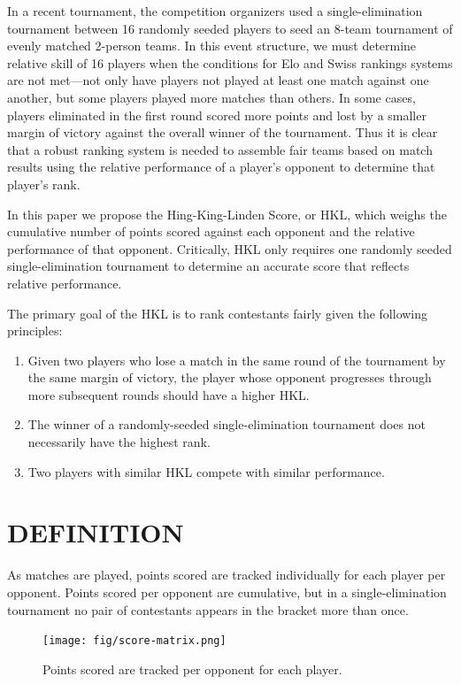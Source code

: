 \documentclass[letterpaper, 10 pt, conference]{ieeeconf}  %
\begin{document}
In a recent tournament, the competition organizers used a single-elimination
tournament between 16 randomly seeded players to seed an 8-team tournament of
evenly matched 2-person teams. In this event structure, we must determine
relative skill of 16 players when the conditions for Elo and Swiss rankings
systems are not met---not only have players not played at least one match
against one another, but some players played more matches than others. In some
cases, players eliminated in the first round scored more points and lost by a
smaller margin of victory against the overall winner of the tournament. Thus it
is clear that a robust ranking system is needed to assemble fair teams based on
match results using the relative performance of a player's opponent to determine
that player's rank.

In this paper we propose the Hing-King-Linden Score, or HKL, which weighs the
cumulative number of points scored against each opponent and the relative
performance of that opponent. Critically, HKL only requires one randomly seeded
single-elimination tournament to determine an accurate score that reflects
relative performance. 

The primary goal of the HKL is to rank contestants fairly given the following
principles:

\begin{enumerate}
        \item Given two players who lose a match in the same round of the
        tournament by the same margin of victory, the player whose opponent
        progresses through more subsequent rounds should have a higher HKL.
        \item The winner of a randomly-seeded single-elimination tournament does
        not necessarily have the highest rank.
        \item Two players with similar HKL compete with similar performance.
\end{enumerate}

\section{DEFINITION}
As matches are played, points scored are tracked individually for each player
per opponent. Points scored per opponent are cumulative, but in a
single-elimination tournament no pair of contestants appears in the bracket more
than once.

\begin{figure}[hb]
        \texttt{[image: fig/score-matrix.png]}
        \label{fig:raw-score}
        \centering
        \caption{Points scored are tracked per opponent for each player.}
\end{figure}
\end{document}
